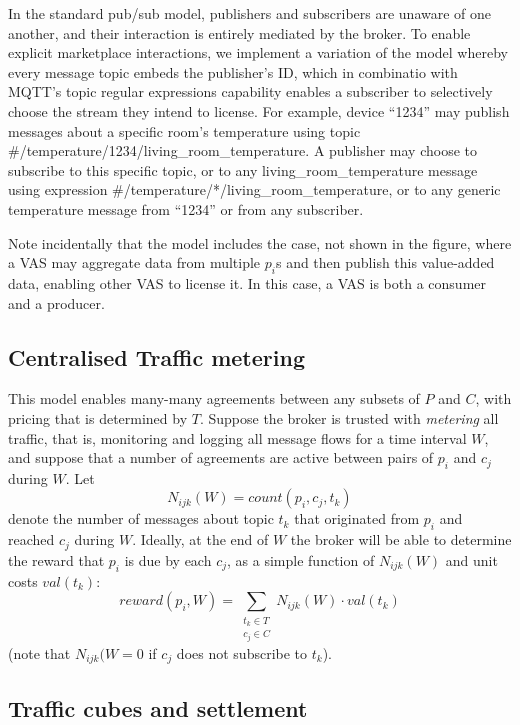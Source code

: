 \documentclass[conference]{IEEEtran}
\begin{document}
In the standard pub/sub model, publishers and subscribers are unaware of one another, and their interaction is entirely mediated by the broker. 
To enable explicit marketplace interactions, we implement a variation of the model whereby every message topic embeds the publisher's ID, which in combinatio with MQTT's topic regular expressions capability enables a subscriber to selectively choose the stream they intend to license.
For example, device ``1234'' may publish messages about a specific room's temperature using topic  \#/temperature/1234/living\_room\_temperature. 
A publisher may choose to subscribe to this specific topic, or to any  living\_room\_temperature message using expression \#/temperature/*/living\_room\_temperature, or to any generic temperature message from ``1234'' or from any subscriber.

Note incidentally that the model includes the case, not shown in the figure, where a VAS may aggregate data from multiple $ p_i $s and then publish this value-added data, enabling other VAS to license it. 
In this case, a VAS is both a consumer and a producer.

\subsection{Centralised Traffic metering}

This model enables many-many agreements between any subsets of $P$ and $C$, with pricing that is determined by $T$.
Suppose the broker is trusted with \textit{metering} all traffic, that is, monitoring and logging all message flows for a time interval $W$, and suppose that a number of agreements are active between pairs of $p_i$ and $c_j$ during $W$.
Let 
\[N_{ijk}(W) = \mathit{count}(p_i, c_j, t_k)\]
denote the number of messages about topic $t_k$ that originated from $p_i$ and reached $c_j$ during $W$.
Ideally, at the end of $W$ the broker will be able to determine the reward that $p_i$ is due by each $c_j$, as a simple function of $N_{ijk}(W)$ and unit costs $\mathit{val}(t_k)$:
\begin{equation}
\mathit{reward}(p_i, W) = \sum_{\substack{t_k \in T \\ c_j \in C}} N_{ijk}(W) \cdot \mathit{val}(t_k)
\label{eq:reward}
\end{equation}
(note that $N_{ijk}(W = 0$ if $c_j$ does not subscribe to $t_k$).

\subsection{Traffic cubes and settlement}
\end{document}
